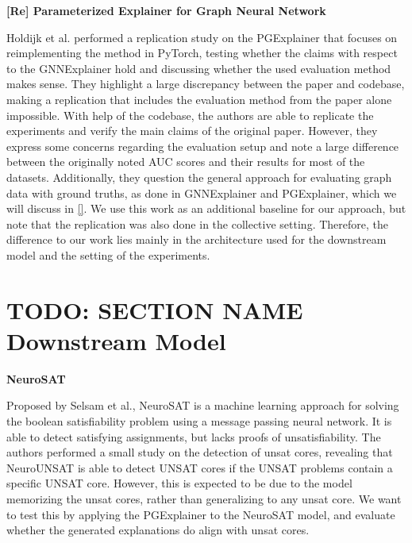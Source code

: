 \textbf{[Re] Parameterized Explainer for Graph Neural Network} \par
Holdijk et al. \cite{holdijk2021re} performed a replication study on the PGExplainer that focuses on reimplementing the method in PyTorch, testing whether the claims with respect to the GNNExplainer hold and discussing whether the used evaluation method makes sense. They highlight a large discrepancy between the paper and codebase, making a replication that includes the evaluation method from the paper alone impossible. With help of the codebase, the authors are able to replicate the experiments and verify the main claims of the original paper. However, they express some concerns regarding the evaluation setup and note a large difference between the originally noted AUC scores and their results for most of the datasets. Additionally, they question the general approach for evaluating graph data with ground truths, as done in GNNExplainer and PGExplainer, which we will discuss in \ref{}. We use this work as an additional baseline for our approach, but note that the replication was also done in the collective setting. Therefore, the difference to our work lies mainly in the architecture used for the downstream model and the setting of the experiments.


\section{TODO: SECTION NAME Downstream Model}
\label{sec:Downstream_Models}

\textbf{NeuroSAT}\par
Proposed by Selsam et al., NeuroSAT \cite{selsam2018learning} is a machine learning approach for solving the boolean satisfiability problem using a message passing neural network. It is able to detect satisfying assignments, but lacks proofs of unsatisfiability. The authors performed a small study on the detection of unsat cores, revealing that NeuroUNSAT is able to detect UNSAT cores if the UNSAT problems contain a specific UNSAT core. However, this is expected to be due to the model memorizing the unsat cores, rather than generalizing to any unsat core. We want to test this by applying the PGExplainer to the NeuroSAT model, and evaluate whether the generated explanations do align with unsat cores.